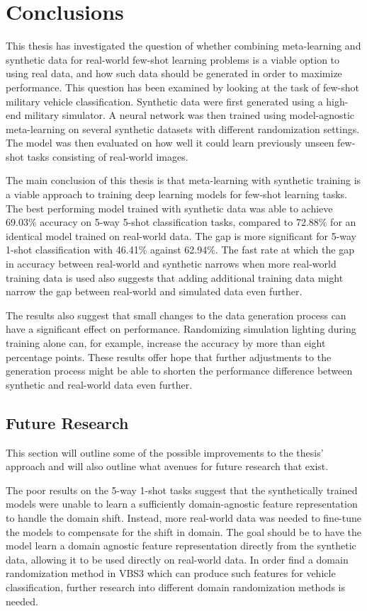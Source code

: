 \chapter{Conclusions} 
This thesis has investigated the question of whether combining meta-learning and synthetic data for real-world few-shot learning problems is a viable option to using real data, and how such data should be generated in order to maximize performance. This question has been examined by looking at the task of few-shot military vehicle classification. Synthetic data were first generated using a high-end military simulator. A neural network was then trained using model-agnostic meta-learning on several synthetic datasets with different randomization settings. The model was then evaluated on how well it could learn previously unseen few-shot tasks consisting of real-world images.

The main conclusion of this thesis is that meta-learning with synthetic training is a viable approach to training deep learning models for few-shot learning tasks. The best performing model trained with synthetic data was able to achieve 69.03\% accuracy on 5-way 5-shot classification tasks, compared to 72.88\% for an identical model trained on real-world data. The gap is more significant for 5-way 1-shot classification with 46.41\% against 62.94\%. The fast rate at which the gap in accuracy between real-world and synthetic narrows when more real-world training data is used also suggests that adding additional training data might narrow the gap between real-world and simulated data even further.

The results also suggest that small changes to the data generation process can have a significant effect on performance. Randomizing simulation lighting during training alone can, for example, increase the accuracy by more than eight percentage points. These results offer hope that further adjustments to the generation process might be able to shorten the performance difference between synthetic and real-world data even further.

\section{Future Research}
This section will outline some of the possible improvements to the thesis' approach and will also outline what avenues for future research that exist.

The poor results on the 5-way 1-shot tasks suggest that the synthetically trained models were unable to learn a sufficiently domain-agnostic feature representation to handle the domain shift. Instead, more real-world data was needed to fine-tune the models to compensate for the shift in domain. The goal should be to have the model learn a domain agnostic feature representation directly from the synthetic data, allowing it to be used directly on real-world data. In order find a domain randomization method in VBS3 which can produce such features for vehicle classification, further research into different domain randomization methods is needed.

